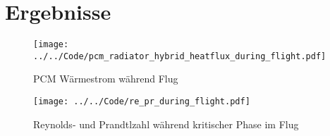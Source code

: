 \chapter{Ergebnisse}
\label{chap:Ergebnisse}
\begin{figure}[H]
  \centering
  \label{fig:pcm_waermestrom_flugsimulation}
  \texttt{[image: ../../Code/pcm\_radiator\_hybrid\_heatflux\_during\_flight.pdf]}
  \caption{PCM Wärmestrom während Flug}
  \label{fig:re_pr_flugsimulation}
  \texttt{[image: ../../Code/re\_pr\_during\_flight.pdf]}
  \caption{Reynolds- und Prandtlzahl während kritischer Phase im Flug}
\end{figure}